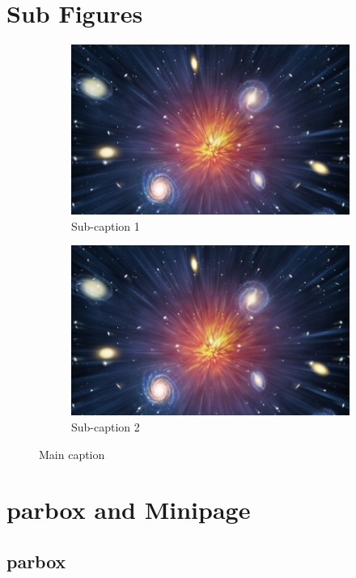 \documentclass[12pt,twoside,a4paper]{article}
\begin{document}
\newpage
\section{Sub Figures}
\begin{figure}[ht]

\begin{subfigure}{0.5\textwidth}
\includegraphics[width=0.9\linewidth]{universe.jpg} 
\caption{Sub-caption 1}
\end{subfigure}
\begin{subfigure}{0.5\textwidth}
\includegraphics[width=0.9\linewidth]{universe.jpg}
\caption{Sub-caption 2}
\label{fig:subim2}
\end{subfigure}

\caption{Main caption}
\end{figure}




\section{parbox and Minipage}

\subsection{parbox}
\parbox{0.4\textwidth}{\raggedright \blindtext[1]} %
\hspace{0.2\textwidth}
\parbox{0.4\textwidth}{\raggedleft \blindtext[1]} %
\end{document}
